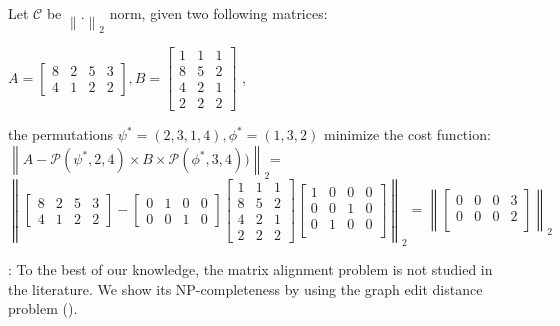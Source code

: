 \documentclass[conference]{IEEEtran}
\begin{document}
{\begin{example}
Let $\mathcal{C}$ be $\left\|.\right\|_2$ norm, given two following matrices:
\begin{center}
{\small{
$A = \begin{bmatrix} 
8 & 2 & 5 & 3\\
4 & 1 & 2 & 2
\end{bmatrix}, B = \begin{bmatrix}
1 & 1 & 1\\
8 & 5 & 2\\
4 & 2 & 1\\
2 & 2 & 2 
\end{bmatrix}$
}}, \\ 
\end{center}
the permutations
$\psi^* = (2,3,1,4), \phi^*=(1,3,2)$ minimize the cost function:
$\left\|A - \mathcal{P}(\psi^*,2,4)\times B \times\mathcal{P}(\phi^*,3,4))\right\|_2$=\\
{\scriptsize{
$
\left\|\begin{bmatrix} 
8 & 2 & 5 & 3 \\
4 & 1 & 2 & 2 
\end{bmatrix} - 
\begin{bmatrix} 
0 & 1 & 0 & 0 \\
0 & 0 & 1 & 0 
\end{bmatrix}
\begin{bmatrix} 
1 & 1 & 1 \\
8 & 5 & 2 \\
4 & 2 & 1 \\
2 & 2 & 2 
\end{bmatrix}
\begin{bmatrix} 
1 & 0 & 0 & 0 \\
0 & 0 & 1 & 0 \\
0 & 1 & 0 & 0 \\
\end{bmatrix}\right\|_2
=
\left\|\begin{bmatrix} 
0 & 0 & 0 & 3 \\
0 & 0 & 0 & 2 \\
\end{bmatrix}\right\|_2$
}}
\label{exp:alignment_problem}
\end{example}




:
To the best of our knowledge, the matrix alignment problem is not studied in the literature. We show its NP-completeness by using the graph edit distance problem (\ged). 


}
\end{document}
